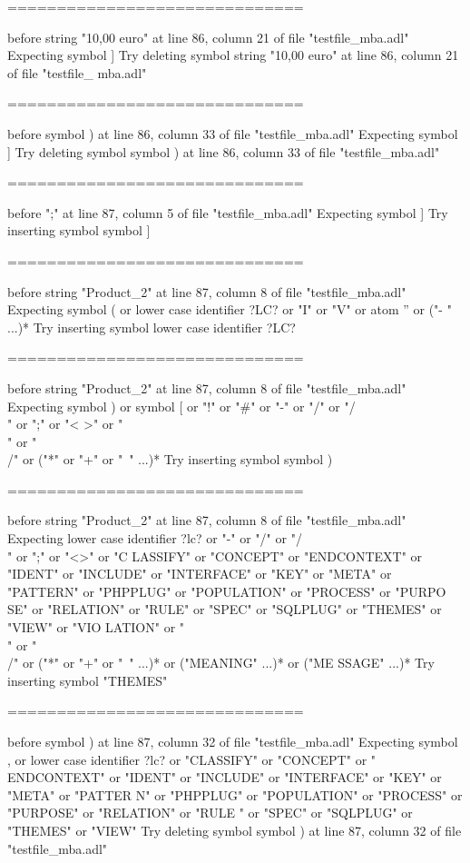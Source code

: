 \begin{description}
\begin{haskell}
==============================

before string "10,00 euro" at line 86, column 21 of file "testfile_mba.adl"
Expecting symbol ]
Try deleting symbol string "10,00 euro" at line 86, column 21 of file "testfile_
mba.adl"

==============================

before symbol ) at line 86, column 33 of file "testfile_mba.adl"
Expecting symbol ]
Try deleting symbol symbol ) at line 86, column 33 of file "testfile_mba.adl"

==============================

before ";" at line 87, column 5 of file "testfile_mba.adl"
Expecting symbol ]
Try inserting symbol symbol ]

==============================

before string "Product_2" at line 87, column 8 of file "testfile_mba.adl"
Expecting symbol ( or lower case identifier ?LC? or "I" or "V" or atom '' or ("-
" ...)*
Try inserting symbol lower case identifier ?LC?

==============================

before string "Product_2" at line 87, column 8 of file "testfile_mba.adl"
Expecting symbol ) or symbol [ or "!" or "#" or "-" or "/" or "/\\" or ";" or "<
>" or "\\" or "\\/" or ("*" or "+" or "~" ...)*
Try inserting symbol symbol )

==============================

before string "Product_2" at line 87, column 8 of file "testfile_mba.adl"
Expecting lower case identifier ?lc? or "-" or "/" or "/\\" or ";" or "<>" or "C
LASSIFY" or "CONCEPT" or "ENDCONTEXT" or "IDENT" or "INCLUDE" or "INTERFACE" or
"KEY" or "META" or "PATTERN" or "PHPPLUG" or "POPULATION" or "PROCESS" or "PURPO
SE" or "RELATION" or "RULE" or "SPEC" or "SQLPLUG" or "THEMES" or "VIEW" or "VIO
LATION" or "\\" or "\\/" or ("*" or "+" or "~" ...)* or ("MEANING" ...)* or ("ME
SSAGE" ...)*
Try inserting symbol "THEMES"

==============================

before symbol ) at line 87, column 32 of file "testfile_mba.adl"
Expecting symbol , or lower case identifier ?lc? or "CLASSIFY" or "CONCEPT" or "
ENDCONTEXT" or "IDENT" or "INCLUDE" or "INTERFACE" or "KEY" or "META" or "PATTER
N" or "PHPPLUG" or "POPULATION" or "PROCESS" or "PURPOSE" or "RELATION" or "RULE
" or "SPEC" or "SQLPLUG" or "THEMES" or "VIEW"
Try deleting symbol symbol ) at line 87, column 32 of file "testfile_mba.adl"


\end{haskell}
\end{description}
